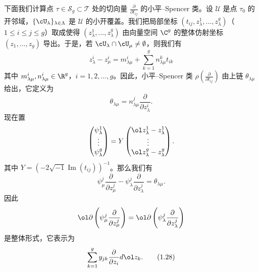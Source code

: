 下面我们计算点 $\tau\in\mathscr{S}_g\subset\mathscr{T}$ 处的切向量 $\frac{\partial}{\partial t_{ij}}$ 的小平–Spencer 类。设 $\mathcal{U}$ 是点 $\tau_0$ 的开邻域，$\{\cU_\lambda\}_{\lambda\in\Lambda}$ 是 $\mathcal{U}$ 的小开覆盖。我们把局部坐标 $(t_{ij},z_\lambda^1,\dots,z_\lambda^g)$（$1\le i\le j\le g$）取成使得 $(z_\lambda^1,\dots,z_\lambda^g)$ 由向量空间 $\C^g$ 的整体仿射坐标 $(z_1,\dots,z_g)$ 导出。于是，若 $\cU_\lambda\cap\cU_\mu\ne\emptyset$，则我们有
\begin{equation}
  z_\lambda^i-z_\mu^i=m_{\lambda\mu}^i+\sum_{k=1}^{g}n_{\lambda\mu}^k t_{ik} \tag{1.26}
\end{equation}
其中 $m_{\lambda\mu}^i,n_{\lambda\mu}^i\in\R^g$，$i=1,2,\dots,g$。因此，小平–Spencer 类 $\rho\left(\frac{\partial}{\partial t_{ij}}\right)$ 由上链 $\theta_{\lambda\mu}$ 给出，它定义为
\begin{equation}
  \theta_{\lambda\mu}=n_{\lambda\mu}^j\frac{\partial}{\partial z_\lambda^i}. \tag{1.27}
\end{equation}
现在置
\[
  \begin{pmatrix}
    \psi_\lambda^1\\
    \vdots\\
    \psi_\lambda^g
  \end{pmatrix}
  =Y\begin{pmatrix}
    \ol z_\lambda^1-z_\lambda^1\\
    \vdots\\
    \ol z_\lambda^g-z_\lambda^g
  \end{pmatrix}.
\]
其中 $Y=(-2\sqrt{-1}\operatorname{Im}(t_{ij}))^{-1}$。那么我们有
\[
  \psi_\mu^j\frac{\partial}{\partial z_\mu^j}-\psi_\lambda^j\frac{\partial}{\partial z_\lambda^j}=\theta_{\lambda\mu}.
\]
因此
\[
  \ol\partial\left(\psi_\mu^j\frac{\partial}{\partial z_\mu^j}\right)
  =\ol\partial\left(\psi_\lambda^j\frac{\partial}{\partial z_\lambda^j}\right)
\]
是整体形式，它表示为
\begin{equation}
  \sum_{k=1}^{g}y_{jk}\frac{\partial}{\partial z_i}d\ol z_k. \tag{1.28}
\end{equation}


